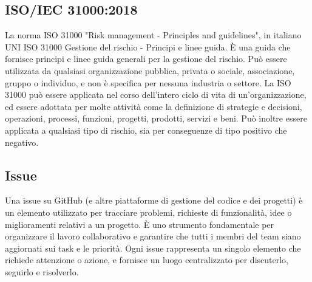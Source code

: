 \hypertarget{ISO/IEC 31000:2018}{}
\subsection*{ISO/IEC 31000:2018}
La norma ISO 31000 "Risk management - Principles and guidelines", 
in italiano UNI ISO 31000 Gestione del rischio - Principi e linee guida. 
È una guida che fornisce principi e linee guida generali per la gestione del rischio. 
Può essere utilizzata da qualsiasi organizzazione pubblica, privata o sociale, associazione, gruppo o individuo, e non è specifica per nessuna industria o settore.
La ISO 31000 può essere applicata nel corso dell'intero ciclo di vita di un'organizzazione, ed essere adottata per molte attività come la definizione di strategie e decisioni, operazioni, processi, funzioni, progetti, prodotti, servizi e beni.
Può inoltre essere applicata a qualsiasi tipo di rischio, sia per conseguenze di tipo positivo che negativo. 

\subsection*{Issue}
Una issue su GitHub (e altre piattaforme di gestione del codice e dei progetti) è un elemento utilizzato per tracciare problemi, richieste di funzionalità, 
idee o miglioramenti relativi a un progetto. È uno strumento fondamentale per organizzare il lavoro collaborativo e garantire che tutti i membri del team 
siano aggiornati sui task e le priorità. Ogni issue rappresenta un singolo elemento che richiede attenzione o azione, e fornisce un luogo centralizzato per 
discuterlo, seguirlo e risolverlo.

\newpage